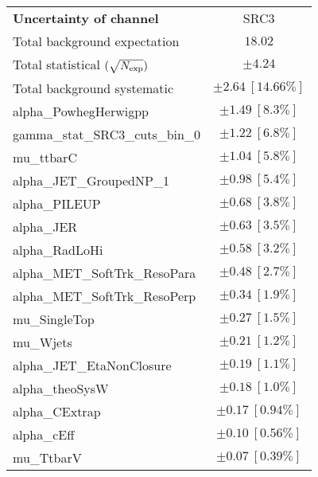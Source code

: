 
\begin{table}
\begin{center}
\setlength{\tabcolsep}{0.0pc}
\begin{tabular*}{\textwidth}{@{\extracolsep{\fill}}lc}
\noalign{\smallskip}\hline\noalign{\smallskip}
{\bf Uncertainty of channel}                                    & SRC3            \\
\noalign{\smallskip}\hline\noalign{\smallskip}
Total background expectation             &  $18.02$       \\
\noalign{\smallskip}\hline\noalign{\smallskip}
Total statistical $(\sqrt{N_{\rm exp}})$              & $\pm 4.24$       \\
Total background systematic               & $\pm 2.64\ [14.66\%] $             \\
\noalign{\smallskip}\hline\noalign{\smallskip}
\noalign{\smallskip}\hline\noalign{\smallskip}
alpha\_PowhegHerwigpp         & $\pm 1.49\ [8.3\%] $       \\
gamma\_stat\_SRC3\_cuts\_bin\_0         & $\pm 1.22\ [6.8\%] $       \\
mu\_ttbarC         & $\pm 1.04\ [5.8\%] $       \\
alpha\_JET\_GroupedNP\_1         & $\pm 0.98\ [5.4\%] $       \\
alpha\_PILEUP         & $\pm 0.68\ [3.8\%] $       \\
alpha\_JER         & $\pm 0.63\ [3.5\%] $       \\
alpha\_RadLoHi         & $\pm 0.58\ [3.2\%] $       \\
alpha\_MET\_SoftTrk\_ResoPara         & $\pm 0.48\ [2.7\%] $       \\
alpha\_MET\_SoftTrk\_ResoPerp         & $\pm 0.34\ [1.9\%] $       \\
mu\_SingleTop         & $\pm 0.27\ [1.5\%] $       \\
mu\_Wjets         & $\pm 0.21\ [1.2\%] $       \\
alpha\_JET\_EtaNonClosure         & $\pm 0.19\ [1.1\%] $       \\
alpha\_theoSysW         & $\pm 0.18\ [1.0\%] $       \\
alpha\_CExtrap         & $\pm 0.17\ [0.94\%] $       \\
alpha\_cEff         & $\pm 0.10\ [0.56\%] $       \\
mu\_TtbarV         & $\pm 0.07\ [0.39\%] $       \\

\end{tabular*}
\end{center}
\end{table}
